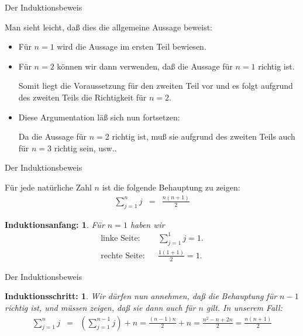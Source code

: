 \documentclass[german]{beamer}
\newcommand{\bq}{\begin{eqnarray*}}
\newcommand{\eq}{\end{eqnarray*}}
\newtheorem*{myproof1}{{\bf Induktionsanfang}:}
\newtheorem*{myproof2}{{\bf Induktionsschritt}:}
\begin{document}
\begin{frame}{Der Induktionsbeweis}

Man sieht leicht, da{\ss} dies die allgemeine Aussage beweist:
\begin{itemize}
\item F\"ur $n=1$ wird die Aussage im ersten Teil bewiesen.
\item F\"ur $n=2$ k\"onnen wir dann verwenden, da{\ss} die Aussage f\"ur $n=1$ richtig ist. 

Somit liegt die Voraussetzung f\"ur den zweiten Teil vor und es folgt
aufgrund des zweiten Teils die Richtigkeit f\"ur $n=2$.
\item Diese Argumentation l\"a{\ss} sich nun fortsetzen: 

Da die Aussage f\"ur $n=2$ richtig ist, mu{\ss} sie aufgrund des zweiten Teils auch f\"ur $n=3$ richtig sein, usw..
\end{itemize}

\end{frame}

\begin{frame}{Der Induktionsbeweis}

\begin{example}
F\"ur jede nat\"urliche Zahl $n$ ist die folgende Behauptung zu zeigen:
\bq
 \sum\limits_{j=1}^n j & = & \frac{n(n+1)}{2}
\eq
\end{example}
\begin{myproof1}
F\"ur $n=1$ haben wir
\bq
 \mbox{linke Seite}: & & \sum\limits_{j=1}^1 j = 1. \\
 \mbox{rechte Seite}: & & \frac{1(1+1)}{2} = 1.
\eq
\end{myproof1}

\end{frame}

\begin{frame}{Der Induktionsbeweis}

\begin{myproof2}
Wir d\"urfen nun annehmen, da{\ss} die Behauptung f\"ur $n-1$ richtig ist, und m\"ussen zeigen, da{\ss} sie dann auch 
f\"ur $n$ gilt. In unserem Fall:
\bq
  \sum\limits_{j=1}^n j & = &  \left( \sum\limits_{j=1}^{n-1} j \right) + n
 = \frac{(n-1)n}{2} + n = \frac{n^2-n+2n}{2} = \frac{n(n+1)}{2}
\eq
\end{myproof2}

\end{frame}
\end{document}
